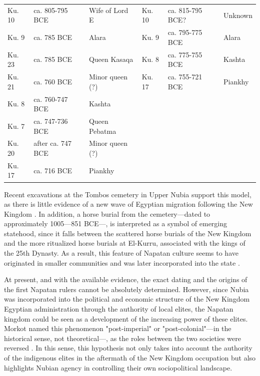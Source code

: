 {\begin{xltabular}{\textwidth}{X X X X X X}
		\cmidrule(r){1-3} \cmidrule(l){4-6}
		Ku. 10 & ca. 805-795 BCE & Wife of Lord E & Ku. 10 & ca. 815-795 BCE? & Unknown \\
		\cmidrule(r){1-3} \cmidrule(l){4-6}
		Ku. 9 & ca. 785 BCE & Alara & Ku. 9 & ca. 795-775 BCE & Alara \\
		\cmidrule(r){1-3} \cmidrule(l){4-6}
		Ku. 23 & ca. 785 BCE & Queen Kasaqa & Ku. 8 & ca. 775-755 BCE & Kashta \\
		\cmidrule(r){1-3} \cmidrule(l){4-6}
		Ku. 21 & ca. 760 BCE & Minor queen (?) & Ku. 17 & ca. 755-721 BCE & Piankhy \\
		\cmidrule(r){1-3} \cmidrule(l){4-6}
		Ku. 8 & ca. 760-747 BCE & Kashta & & & \\
		\cmidrule(r){1-3} \cmidrule(l){4-6}
		Ku. 7 & ca. 747-736 BCE & Queen Pebatma & & & \\
		\cmidrule(r){1-3} \cmidrule(l){4-6}
		Ku. 20 & after ca. 747 BCE & Minor queen (?) & & & \\
		\cmidrule(r){1-3} \cmidrule(l){4-6}
		Ku. 17 & ca. 716 BCE & Piankhy & & & \\
	\end{xltabular}
}

Recent excavations at the Tombos cemetery in Upper Nubia support this model, as there is little evidence of a new wave of Egyptian migration following the New Kingdom \parencite{buzonEntanglementFormationAncient2016}. In addition, a horse burial from the cemetery---dated to approximately 1005---851 BCE---, is interpreted as a symbol of emerging statehood, since it falls between the scattered horse burials of the New Kingdom and the more ritualized horse burials at El-Kurru, associated with the kings of the 25th Dynasty. As a result, this feature of Napatan culture seems to have originated in smaller communities and was later incorporated into the state \parencite{schraderColonialindigeneInteractionAncient2018}.

At present, and with the available evidence, the exact dating and the origins of the first Napatan rulers cannot be absolutely determined. However, since Nubia was incorporated into the political and economic structure of the New Kingdom Egyptian administration through the authority of local elites, the Napatan kingdom could be seen as a development of the increasing power of these elites. Morkot named this phenomenon "post-imperial" or "post-colonial"---in the historical sense, not theoretical---, as the roles between the two societies were reversed \parencite[p.~914-915]{morkotConqueredConquerorOrganization2013}. In this sense, this hypothesis not only takes into account the authority of the indigenous elites in the aftermath of the New Kingdom occupation but also highlights Nubian agency in controlling their own sociopolitical landscape.


